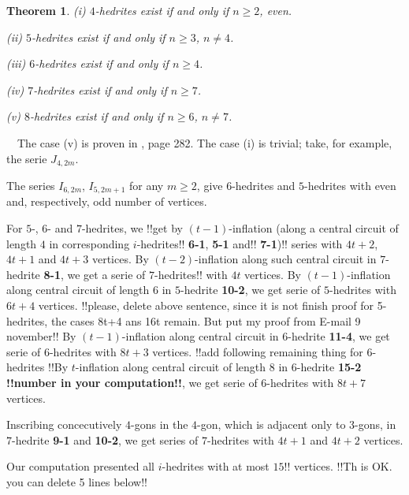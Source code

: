 \documentclass[12pt]{article}
\newtheorem{theorem}{Theorem}
\newcommand{\proof}{\noindent{\bf Proof.}\ \ }
\begin{document}
\begin{theorem}

(i) $4$-hedrites exist if and only if $n\geq 2$, even.

(ii) $5$-hedrites exist if and only if $n\geq 3$, $n\not= 4$.

(iii) $6$-hedrites exist if and only if $n\geq 4$.

(iv) $7$-hedrites exist if and only if $n\geq 7$.

(v) $8$-hedrites exist if and only if $n\geq 6$, $n\not= 7$.

\end{theorem}
\proof The case (v) is proven in \cite{Gr}, page 282.
The case (i) is trivial; take, for example, the serie $J_{4,2m}$.

The series $I_{6,2m}$, $I_{5,2m+1}$ for any $m \ge 2$, give $6$-hedrites
and $5$-hedrites with even and, respectively, odd number of vertices.

For $5$-, $6$- and $7$-hedrites, we 
!!get by $(t-1)$-inflation 
(along a central circuit of length $4$ in corresponding 
$i$-hedrites!! {\bf 6-1}, {\bf 5-1} and!! {\bf 7-1})!!
series with $4t+2$, $4t+1$ and 
$4t+3$ vertices. By $(t-2)$-inflation
along such central circuit in $7$-hedrite {\bf 8-1}, we get a serie of
$7$-hedrites!! with $4t$ vertices.
By $(t-1)$-inflation along central circuit of length $6$ in 
$5$-hedrite {\bf 10-2}, we get serie of $5$-hedrites with $6t+4$ vertices.
!!please, delete above sentence, since it is not finish proof for
5-hedrites, the cases 8t+4 ans 16t remain. But put my proof
from E-mail 9 november!!
By $(t-1)$-inflation along central circuit in $6$-hedrite {\bf 11-4}, we
get serie of $6$-hedrites with $8t+3$ vertices.
!!add following remaining thing for 6-hedrites
!!By $t$-inflation along central circuit of length $8$ in 
$6$-hedrite {\bf 15-2 !!number in your computation!!}, 
we get serie of $6$-hedrites with $8t+7$ vertices. 

Inscribing concecutively $4$-gons in the $4$-gon, which is adjacent only to
$3$-gons, in $7$-hedrite {\bf 9-1} and {\bf 10-2}, we get series of 
$7$-hedrites with $4t+1$ and $4t+2$ vertices.





Our computation presented all $i$-hedrites with at most $15!!$ 
vertices. 
!!Th is OK. you can delete 5 lines below!!
\end{document}
